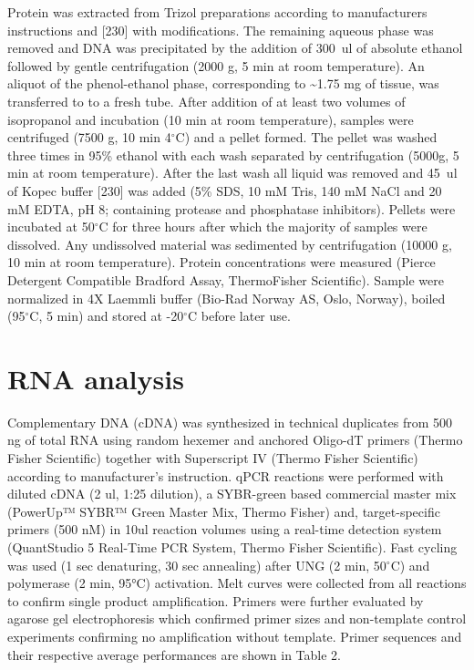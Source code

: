 \documentclass[twoside,10pt]{gihclass} %
\begin{document}
Protein was extracted from Trizol preparations according to manufacturers instructions and {[}230{]} with modifications. The remaining aqueous phase was removed and DNA was precipitated by the addition of \SI{300}{ul} of absolute ethanol followed by gentle centrifugation (2000 g, 5 min at room temperature). An aliquot of the phenol-ethanol phase, corresponding to \textasciitilde1.75 mg of tissue, was transferred to to a fresh tube. After addition of at least two volumes of isopropanol and incubation (10 min at room temperature), samples were centrifuged (7500 g, 10 min 4\(^{\circ}\)C) and a pellet formed. The pellet was washed three times in 95\% ethanol with each wash separated by centrifugation (5000g, 5 min at room temperature). After the last wash all liquid was removed and \SI{45}{ul} of Kopec buffer {[}230{]} was added (5\% SDS, 10 mM Tris, 140 mM NaCl and 20 mM EDTA, pH 8; containing protease and phosphatase inhibitors). Pellets were incubated at 50\(^{\circ}\)C for three hours after which the majority of samples were dissolved. Any undissolved material was sedimented by centrifugation (10000 g, 10 min at room temperature). Protein concentrations were measured (Pierce Detergent Compatible Bradford Assay, ThermoFisher Scientific). Sample were normalized in 4X Laemmli buffer (Bio-Rad Norway AS, Oslo, Norway), boiled (95\(^{\circ}\)C, 5 min) and stored at -20\(^{\circ}\)C before later use.

\hypertarget{rna-analysis}{%
\section{RNA analysis}\label{rna-analysis}}

Complementary DNA (cDNA) was synthesized in technical duplicates from 500 ng of total RNA using random hexemer and anchored Oligo-dT primers (Thermo Fisher Scientific) together with Superscript IV (Thermo Fisher Scientific) according to manufacturer's instruction. qPCR reactions were performed with diluted cDNA (2 ul, 1:25 dilution), a SYBR-green based commercial master mix (PowerUp™ SYBR™ Green Master Mix, Thermo Fisher) and, target-specific primers (500 nM) in 10ul reaction volumes using a real-time detection system (QuantStudio 5 Real-Time PCR System, Thermo Fisher Scientific). Fast cycling was used (1 sec denaturing, 30 sec annealing) after UNG (2 min, 50\(^{\circ}\)C) and polymerase (2 min, 95°C) activation. Melt curves were collected from all reactions to confirm single product amplification. Primers were further evaluated by agarose gel electrophoresis which confirmed primer sizes and non-template control experiments confirming no amplification without template. Primer sequences and their respective average performances are shown in Table 2.
\end{document}
